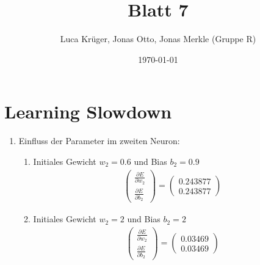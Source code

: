 \documentclass{article}
\title{Blatt 7}
\author{Luca Krüger, Jonas Otto, Jonas Merkle (Gruppe R)}
\date{\today}
\begin{document}
\maketitle
\section{Learning Slowdown}
\begin{enumerate}
  \item Einfluss der Parameter im zweiten Neuron:
        \begin{enumerate}[label = \alph*)]
          \item Initiales Gewicht $w_2 = 0.6$ und Bias $b_2 = 0.9$
                \begin{align*}
                  \begin{pmatrix}\frac{\partial E}{\partial w_2} \\ \frac{\partial E}{\partial b_2}\end{pmatrix} = \begin{pmatrix} 0.243877 \\  0.243877\end{pmatrix}
                \end{align*}
          \item Initiales Gewicht $w_2 = 2$ und Bias $b_2 = 2$
                \begin{align*}
                  \begin{pmatrix}\frac{\partial E}{\partial w_2} \\ \frac{\partial E}{\partial b_2}\end{pmatrix} = \begin{pmatrix} 0.03469 \\  0.03469\end{pmatrix}
                \end{align*}


\end{enumerate}
\end{enumerate}
\end{document}
